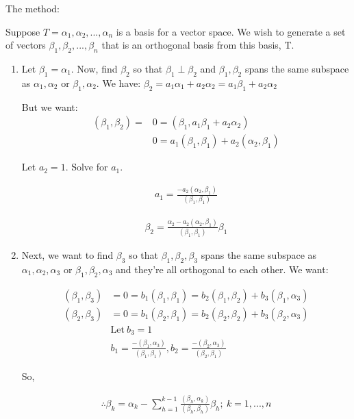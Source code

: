 The method:

Suppose $T = {\alpha_1, \alpha_2, ..., \alpha_n}$ is a basis for a vector space. We wish to generate a set of vectors ${\beta_1, \beta_2, ..., \beta_n}$ that is an orthogonal basis from this basis, T.

\begin{enumerate}
  \item Let $\beta_1 = \alpha_1$. Now, find $\beta_2$ so that $\beta_1 \perp \beta_2$ and $\beta_1, \beta_2$ spans the same subspace as ${\alpha_1, \alpha_2}$ or ${\beta_1, \alpha_2}$. We have: $\beta_2 = a_1\alpha_1 + a_2\alpha_2 = a_1\beta_1 + a_2\alpha_2$

  But we want:
  \begin{align*}
    (\beta_1, \beta_2) = &0 = (\beta_1, a_1\beta_1 + a_2\alpha_2) \\ 
                         &0 = a_1(\beta_1, \beta_1) + a_2(\alpha_2, \beta_1)
  \end{align*}

  Let $a_2 = 1$. Solve for $a_1$.

  \begin{align*}
    a_1 = \frac{-a_2(\alpha_2, \beta_1)}{(\beta_1, \beta_1)}
  \end{align*}

  \begin{align*}
    \beta_2 = \frac{\alpha_2 - a_2(\alpha_2, \beta_1)}{(\beta_1, \beta_1)} \beta_1
  \end{align*}

  \item Next, we want to find $\beta_3$ so that ${\beta_1, \beta_2, \beta_3}$ spans the same subspace as ${\alpha_1, \alpha_2, \alpha_3}$ or ${\beta_1, \beta_2, \alpha_3}$ and they're all orthogonal to each other. We want:

  \begin{align*}
    (\beta_1, \beta_3) &= 0 = b_1(\beta_1, \beta_1) = b_2(\beta_1, \beta_2) + b_3(\beta_1, \alpha_3) \\
    (\beta_2, \beta_3) &= 0 = b_1(\beta_2, \beta_1) = b_2(\beta_2, \beta_2) + b_3(\beta_2, \alpha_3) \\
                       &\text{Let}\ b_3 = 1 \\
                       &b_1 = \frac{-(\beta_1, \alpha_3)}{(\beta_1, \beta_1)}, b_2 = \frac{-(\beta_2, \alpha_3)}{(\beta_2, \beta_1)}
  \end{align*}

  So,

  \begin{align*}
    \therefore \beta_k = \alpha_k - \sum_{h=1}^{k-1} \frac{(\beta_h, \alpha_k)}{(\beta_h, \beta_h)} \beta_h;\ k = 1, ..., n
  \end{align*}


\end{enumerate}
